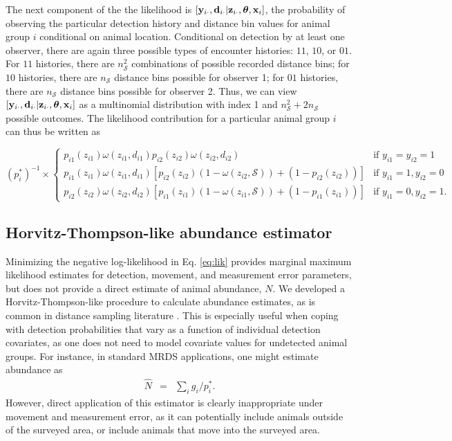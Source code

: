 \documentclass[12pt,fleqn]{article}
\begin{document}
The next component of the the likelihood is $[{\bf y}_{i \cdot},{\bf d}_{i \cdot}|{\bf z}_{i \cdot} , \boldsymbol{\theta} , {\bf x}_i]$, the probability of observing the particular detection history and distance bin values for animal group $i$ conditional on animal location.  Conditional on detection by at least one observer, there are again three possible types of encounter histories: $11$, $10$, or $01$.  For $11$ histories, there are $n_\mathcal{S}^2$ combinations of possible recorded distance bins; for $10$ histories, there are $n_\mathcal{S}$ distance bins possible for observer 1; for $01$ histories, there are $n_\mathcal{S}$ distance bins possible for observer 2.  Thus, we can view $[{\bf y}_{i \cdot},{\bf d}_{i \cdot}|{\bf z}_{i \cdot} , \boldsymbol{\theta} , {\bf x}_i]$ as a multinomial distribution with index 1 and $n_\mathcal{S}^2 + 2 n_\mathcal{S}$ possible outcomes. The likelihood contribution for a particular animal group $i$ can thus be written as
\begin{linenomath}
\begin{equation}
    \label{eq:obsmod}
    (p_i^*)^{-1} \times  \left\{ \begin{array}{rl}
    p_{i1}(z_{i1}) \omega(z_{i1},d_{i1}) p_{i2}(z_{i2}) \omega(z_{i2},d_{i2}) & \text{if }y_{i1}=y_{i2}=1 \\
    p_{i1}(z_{i1})\omega(z_{i1},d_{i1}) \left[
    p_{i2}(z_{i2})(1-\omega(z_{i2},\mathcal{S}))+(1-p_{i2}(z_{i2})) \right] &  \text{if } y_{i1}=1, y_{i2}=0 \\
    p_{i2}(z_{i2})\omega(z_{i2},d_{i2}) \left[
    p_{i1}(z_{i1})(1-\omega(z_{i1},\mathcal{S}))+(1-p_{i1}(z_{i1})) \right]
                                     &  \text{if } y_{i1}=0, y_{i2}=1.
                                    \end{array} \right.
\end{equation}
\end{linenomath}

\subsection{Horvitz-Thompson-like abundance estimator}

Minimizing the negative log-likelihood in Eq. \ref{eq:lik} provides marginal maximum likelihood estimates for detection, movement, and measurement error parameters, but does not provide a direct estimate of animal abundance, $N$.  We developed a Horvitz-Thompson-like procedure to calculate abundance estimates, as is common in distance sampling literature \citep[see e.g.][]{BucklandEtAl2004}.  This is especially useful when coping with detection probabilities that vary as a function of individual detection covariates, as one does not need to model covariate values for undetected animal groups.  For instance, in standard MRDS applications, one might estimate abundance as
\begin{eqnarray*}
  \hat{N} & = & \sum_i g_i / p_i^*.
\end{eqnarray*}
However, direct application of this estimator is clearly inappropriate under movement and measurement error, as it can potentially include animals outside of the surveyed area, or include animals that move into the surveyed area.
\end{document}
